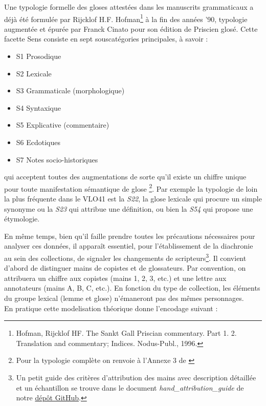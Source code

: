 \documentclass[a4paper, twoside, 12pt]{book}
\begin{document}
Une typologie formelle des gloses attestées dans les manuscrits grammaticaux a déjà été formulée par Rijcklof H.F. Hofman\footnote{Hofman, Rijcklof HF. The Sankt Gall Priscian commentary. Part 1. 2. Translation and commentary; Indices. Nodus-Publ., 1996.} à la fin des années '90, typologie augmentée et épurée par Franck Cinato pour son édition de Priscien glosé. Cette facette \og{} Sens \fg{} consiste en sept souscatégories principales, à savoir :

\begin{itemize}
    \item S1 Prosodique
    \item S2 Lexicale
    \item S3 Grammaticale (morphologique)
    \item S4 Syntaxique
    \item S5 Explicative (commentaire)
    \item S6 Ecdotiques
    \item S7 Notes socio-historiques
\end{itemize}
 qui acceptent toutes des augmentations de sorte qu'il existe un chiffre unique pour toute manifestation sémantique de glose \footnote{Pour la typologie complète on renvoie à l'Annexe 3 de \cite{cinato2015priscien}}. Par exemple la typologie de loin la plus fréquente dans le VLO41 est la \textit{S22}, la glose lexicale qui procure un simple synonyme ou la \textit{S23} qui attribue une définition, ou bien la \textit{S54} qui propose une étymologie.
 
En même temps, bien qu’il faille prendre toutes les précautions nécessaires pour analyser ces données, il apparaît essentiel, pour l’établissement de la diachronie au sein des collections, de signaler les changements de scripteurs\footnote{Un petit guide des critères d'attribution des mains avec description détaillée et un échantillon se trouve dans le document \textit{hand\_attribution\_guide} de notre \href{https://github.com/malamatenia/Eutychès/blob/main/hand_attribution_guide.pdf}{dépôt GitHub}.}. Il convient d’abord de distinguer mains de copistes et de glossateurs. Par convention, on attribuera un chiffre aux copistes (mains 1, 2, 3, etc.) et une lettre aux annotateurs (mains A, B, C, etc.). En fonction du type de collection, les éléments du groupe lexical (lemme et glose) n’émaneront pas des mêmes personnages. \\

En pratique cette modelisation théorique donne l'encodage suivant : 
\end{document}
